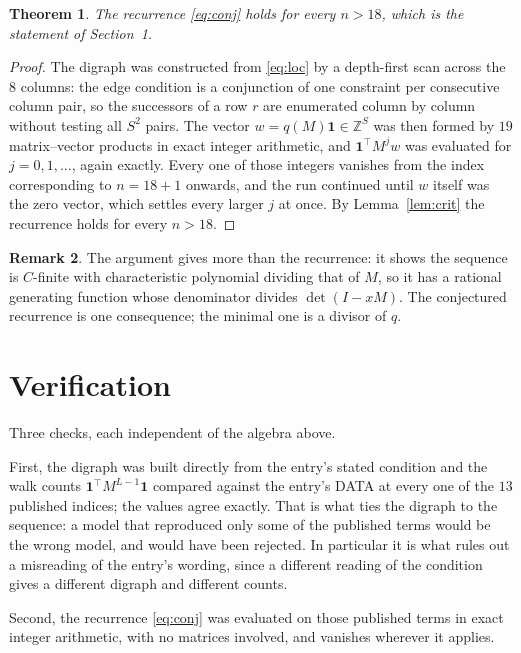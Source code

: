 \documentclass[11pt,a4paper]{article}
\theoremstyle{plain}
\newtheorem{theorem}{Theorem}
\theoremstyle{definition}
\newtheorem{remark}[theorem]{Remark}
\begin{document}
\begin{theorem}
The recurrence \eqref{eq:conj} holds for every $n>18$, which is the statement of
Section~1.
\end{theorem}

\begin{proof}
The digraph was constructed from \eqref{eq:loc} by a depth-first scan across the $8$
columns: the edge condition is a conjunction of one constraint per consecutive column
pair, so the successors of a row $r$ are enumerated column by column without testing all
$S^2$ pairs. The vector $w=q(M)\mathbf{1}\in\mathbb{Z}^{S}$ was then formed by $19$
matrix--vector products in exact integer arithmetic, and $\mathbf{1}^{\!\top}M^{j}w$ was
evaluated for $j=0,1,\dots$, again exactly. Every one of those integers vanishes from the
index corresponding to $n=18+1$ onwards, and the run continued until $w$ itself was the
zero vector, which settles every larger $j$ at once. By Lemma~\ref{lem:crit} the recurrence
holds for every $n>18$.
\end{proof}

\begin{remark}
The argument gives more than the recurrence: it shows the sequence is $C$-finite with
characteristic polynomial dividing that of $M$, so it has a rational generating function
whose denominator divides $\det(I-xM)$. The conjectured recurrence is one consequence; the
minimal one is a divisor of $q$.
\end{remark}

\section{Verification}

Three checks, each independent of the algebra above.

First, the digraph was built directly from the entry's stated condition and the walk counts
$\mathbf{1}^{\!\top}M^{L-1}\mathbf{1}$ compared against the entry's DATA at
every one of the $13$ published indices; the values agree exactly. That is what ties
the digraph to the sequence: a model that reproduced only some of the published terms would
be the wrong model, and would have been rejected. In particular it is what rules out a
misreading of the entry's wording, since a different reading of the condition gives a
different digraph and different counts.

Second, the recurrence \eqref{eq:conj} was evaluated on those published terms in exact
integer arithmetic, with no matrices involved, and vanishes wherever it applies.
\end{document}
